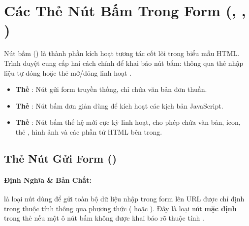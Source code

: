 \section[Các Thẻ Nút Bấm Trong Form (\taghint{<input type="submit">}, \taghint{<input type="button">}, \taghint{<button>})]{Các Thẻ Nút Bấm Trong Form (, , )}
\label{sec:html_form_buttons}

\begin{conceptBox}
Nút bấm () là thành phần kích hoạt tương tác cốt lõi trong biểu mẫu HTML. Trình duyệt cung cấp hai cách chính để khai báo nút bấm: thông qua thẻ nhập liệu tự đóng  hoặc thẻ mở/đóng linh hoạt .
\begin{itemize}[leftmargin=1.5em, itemsep=2pt, parsep=0pt]
    \item \textbf{Thẻ }: Nút gửi form truyền thống, chỉ chứa văn bản đơn thuần.
    \item \textbf{Thẻ }: Nút bấm đơn giản dùng để kích hoạt các kịch bản JavaScript.
    \item \textbf{Thẻ }: Nút bấm thế hệ mới cực kỳ linh hoạt, cho phép chứa văn bản, icon, thẻ , hình ảnh và các phần tử HTML bên trong.
\end{itemize}
\end{conceptBox}

\subsection{Thẻ Nút Gửi Form ()}
\label{subsec:input_submit}

\paragraph{Định Nghĩa \& Bản Chất:}
 là loại nút dùng để gửi toàn bộ dữ liệu nhập trong form lên URL được chỉ định trong thuộc tính  thông qua phương thức  ( hoặc ). Đây là loại nút \textbf{mặc định} trong thẻ  nếu một ô nút bấm không được khai báo rõ thuộc tính .

